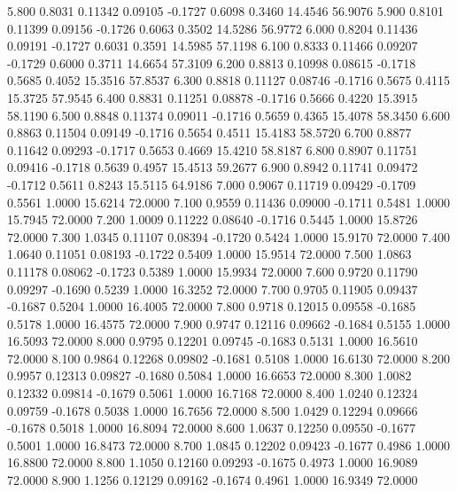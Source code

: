    5.800   0.8031   0.11342   0.09105  -0.1727   0.6098   0.3460  14.4546  56.9076
   5.900   0.8101   0.11399   0.09156  -0.1726   0.6063   0.3502  14.5286  56.9772
   6.000   0.8204   0.11436   0.09191  -0.1727   0.6031   0.3591  14.5985  57.1198
   6.100   0.8333   0.11466   0.09207  -0.1729   0.6000   0.3711  14.6654  57.3109
   6.200   0.8813   0.10998   0.08615  -0.1718   0.5685   0.4052  15.3516  57.8537
   6.300   0.8818   0.11127   0.08746  -0.1716   0.5675   0.4115  15.3725  57.9545
   6.400   0.8831   0.11251   0.08878  -0.1716   0.5666   0.4220  15.3915  58.1190
   6.500   0.8848   0.11374   0.09011  -0.1716   0.5659   0.4365  15.4078  58.3450
   6.600   0.8863   0.11504   0.09149  -0.1716   0.5654   0.4511  15.4183  58.5720
   6.700   0.8877   0.11642   0.09293  -0.1717   0.5653   0.4669  15.4210  58.8187
   6.800   0.8907   0.11751   0.09416  -0.1718   0.5639   0.4957  15.4513  59.2677
   6.900   0.8942   0.11741   0.09472  -0.1712   0.5611   0.8243  15.5115  64.9186
   7.000   0.9067   0.11719   0.09429  -0.1709   0.5561   1.0000  15.6214  72.0000
   7.100   0.9559   0.11436   0.09000  -0.1711   0.5481   1.0000  15.7945  72.0000
   7.200   1.0009   0.11222   0.08640  -0.1716   0.5445   1.0000  15.8726  72.0000
   7.300   1.0345   0.11107   0.08394  -0.1720   0.5424   1.0000  15.9170  72.0000
   7.400   1.0640   0.11051   0.08193  -0.1722   0.5409   1.0000  15.9514  72.0000
   7.500   1.0863   0.11178   0.08062  -0.1723   0.5389   1.0000  15.9934  72.0000
   7.600   0.9720   0.11790   0.09297  -0.1690   0.5239   1.0000  16.3252  72.0000
   7.700   0.9705   0.11905   0.09437  -0.1687   0.5204   1.0000  16.4005  72.0000
   7.800   0.9718   0.12015   0.09558  -0.1685   0.5178   1.0000  16.4575  72.0000
   7.900   0.9747   0.12116   0.09662  -0.1684   0.5155   1.0000  16.5093  72.0000
   8.000   0.9795   0.12201   0.09745  -0.1683   0.5131   1.0000  16.5610  72.0000
   8.100   0.9864   0.12268   0.09802  -0.1681   0.5108   1.0000  16.6130  72.0000
   8.200   0.9957   0.12313   0.09827  -0.1680   0.5084   1.0000  16.6653  72.0000
   8.300   1.0082   0.12332   0.09814  -0.1679   0.5061   1.0000  16.7168  72.0000
   8.400   1.0240   0.12324   0.09759  -0.1678   0.5038   1.0000  16.7656  72.0000
   8.500   1.0429   0.12294   0.09666  -0.1678   0.5018   1.0000  16.8094  72.0000
   8.600   1.0637   0.12250   0.09550  -0.1677   0.5001   1.0000  16.8473  72.0000
   8.700   1.0845   0.12202   0.09423  -0.1677   0.4986   1.0000  16.8800  72.0000
   8.800   1.1050   0.12160   0.09293  -0.1675   0.4973   1.0000  16.9089  72.0000
   8.900   1.1256   0.12129   0.09162  -0.1674   0.4961   1.0000  16.9349  72.0000
